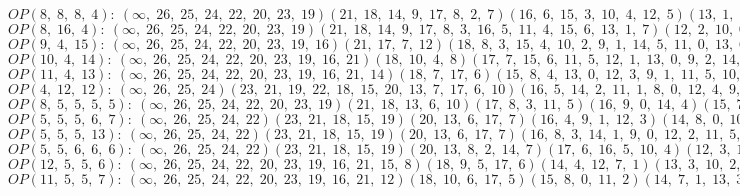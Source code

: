 $OP(8, \;8, \;8, \;4): \:(\infty, \;26, \;25, \;24, \;22, \;20, \;23, \;19)(21, \;18, \;14, \;9, \;17, \;8, \;2, \;7)(16, \;6, \;15, \;3, \;10, \;4, \;12, \;5)(13, \;1, \;11, \;0)$\\
$OP(8, \;16, \;4): \:(\infty, \;26, \;25, \;24, \;22, \;20, \;23, \;19)(21, \;18, \;14, \;9, \;17, \;8, \;3, \;16, \;5, \;11, \;4, \;15, \;6, \;13, \;1, \;7)(12, \;2, \;10, \;0)$\\
$OP(9, \;4, \;15): \:(\infty, \;26, \;25, \;24, \;22, \;20, \;23, \;19, \;16)(21, \;17, \;7, \;12)(18, \;8, \;3, \;15, \;4, \;10, \;2, \;9, \;1, \;14, \;5, \;11, \;0, \;13, \;6)$\\
$OP(10, \;4, \;14): \:(\infty, \;26, \;25, \;24, \;22, \;20, \;23, \;19, \;16, \;21)(18, \;10, \;4, \;8)(17, \;7, \;15, \;6, \;11, \;5, \;12, \;1, \;13, \;0, \;9, \;2, \;14, \;3)$\\
$OP(11, \;4, \;13): \:(\infty, \;26, \;25, \;24, \;22, \;20, \;23, \;19, \;16, \;21, \;14)(18, \;7, \;17, \;6)(15, \;8, \;4, \;13, \;0, \;12, \;3, \;9, \;1, \;11, \;5, \;10, \;2)$\\
$OP(4, \;12, \;12): \:(\infty, \;26, \;25, \;24)(23, \;21, \;19, \;22, \;18, \;15, \;20, \;13, \;7, \;17, \;6, \;10)(16, \;5, \;14, \;2, \;11, \;1, \;8, \;0, \;12, \;4, \;9, \;3)$\\
$OP(8, \;5, \;5, \;5, \;5): \:(\infty, \;26, \;25, \;24, \;22, \;20, \;23, \;19)(21, \;18, \;13, \;6, \;10)(17, \;8, \;3, \;11, \;5)(16, \;9, \;0, \;14, \;4)(15, \;7, \;1, \;12, \;2)$\\
$OP(5, \;5, \;5, \;6, \;7): \:(\infty, \;26, \;25, \;24, \;22)(23, \;21, \;18, \;15, \;19)(20, \;13, \;6, \;17, \;7)(16, \;4, \;9, \;1, \;12, \;3)(14, \;8, \;0, \;10, \;5, \;11, \;2)$\\
$OP(5, \;5, \;5, \;13): \:(\infty, \;26, \;25, \;24, \;22)(23, \;21, \;18, \;15, \;19)(20, \;13, \;6, \;17, \;7)(16, \;8, \;3, \;14, \;1, \;9, \;0, \;12, \;2, \;11, \;5, \;10, \;4)$\\
$OP(5, \;5, \;6, \;6, \;6): \:(\infty, \;26, \;25, \;24, \;22)(23, \;21, \;18, \;15, \;19)(20, \;13, \;8, \;2, \;14, \;7)(17, \;6, \;16, \;5, \;10, \;4)(12, \;3, \;11, \;1, \;9, \;0)$\\
$OP(12, \;5, \;5, \;6): \:(\infty, \;26, \;25, \;24, \;22, \;20, \;23, \;19, \;16, \;21, \;15, \;8)(18, \;9, \;5, \;17, \;6)(14, \;4, \;12, \;7, \;1)(13, \;3, \;10, \;2, \;11, \;0)$\\
$OP(11, \;5, \;5, \;7): \:(\infty, \;26, \;25, \;24, \;22, \;20, \;23, \;19, \;16, \;21, \;12)(18, \;10, \;6, \;17, \;5)(15, \;8, \;0, \;11, \;2)(14, \;7, \;1, \;13, \;3, \;9, \;4)$\\
